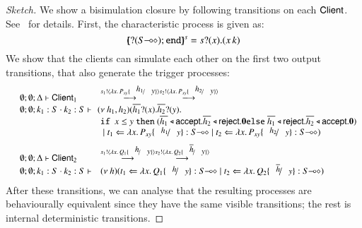 \begin{proof}[Sketch]
	\noi We show a bisimulation closure by following transitions on each $\mathsf{Client}$.
	See~ for details.
	First, the characteristic process is given as:
	$$\mapchar{\btinp{\lhot{S}} \tinact}{s} = \binp{s}{x} (\appl{x}{k})$$
We show that the clients can simulate each other on
the first two output transitions, that also generate the trigger
processes:
%
\[
	\begin{array}{lll}
&	\es; \es; \Delta \proves \Client_1
	&
		\by{\bactout{s_1}{\abs{x}{P_{xy} \subst{h_1}{y}}}}
		\by{\bactout{s_2}{\abs{x}{P_{xy} \subst{h_2}{y}}}}
		\\
&		\es; \es; k_1: S \cat k_2: S \proves
		& \!\!
		\newsp{h_1, h_2}{\binp{\dual{h_1}}{x} \binp{\dual{h_2}}{y}\\
&		& \If\ x \leq y\ \Then (\bsel{\dual{h_1}}{\accept} \bsel{\dual{h_2}}{\reject} \inact
		\Else \bsel{\dual{h_1}}{\reject} \bsel{\dual{h_2}}{\accept} \inact)\\
&		& \Par \ftrigger{t_1}{\abs{x}{P_{xy} \subst{h_1}{y}}}{\lhot{S}} \Par \ftrigger{t_2}{\abs{x}{P_{xy} \subst{h_2}{y}}}{\lhot{S}}}
		\\[2mm]
 &
		\es; \es; \Delta \proves \Client_2
		&\by{\bactout{s_1}{\abs{x}{Q_1 \subst{h}{y}}}}
		\by{\bactout{s_2}{\abs{x}{Q_2 \subst{\dual{h}}{y}}}}
		\\
&		\es; \es; k_1: S \cat k_2: S \proves & \newsp{h}{
		\ftrigger{t_1}{\abs{x}{Q_1 \subst{h}{y}}}{\lhot{S}} \Par \ftrigger{t_2}{\abs{x}{Q_2 \subst{\dual{h}}{y}}}{\lhot{S}}}
	\end{array}
\]
	\noi 
After these transitions, 
we can analyse that 
the resulting processes are behaviourally equivalent
since they have the same visible transitions; the rest 
is internal deterministic transitions. 
\end{proof}

